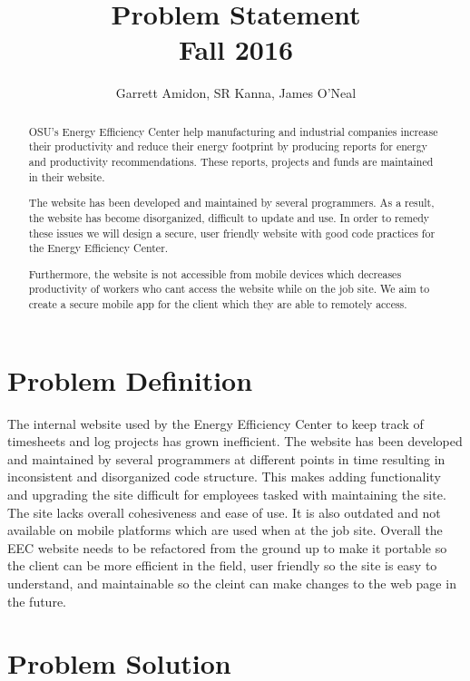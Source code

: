 \documentclass[letterpaper,10pt,titlepage,draftclsnofoot,onecolumn]{IEEEtran}
\title{Problem Statement \\
	\large Fall 2016}
\author{Garrett Amidon, SR Kanna, James O'Neal}
\begin{document}
\begin{titlingpage}
    \maketitle
	\centering{}
    \begin{abstract}
        OSU’s Energy Efficiency Center help manufacturing and industrial companies increase their productivity and reduce their energy footprint by producing reports for energy and productivity recommendations. These reports, projects and funds are maintained in their website.\newline

		The website has been developed and maintained by several programmers. As a result, the website has become disorganized, difficult to update and use. In order to remedy these issues we will design a secure, user friendly website with good code practices for the Energy Efficiency Center.\newline

		Furthermore, the website is not accessible from mobile devices which decreases productivity of workers who cant access the website while on the job site. We aim to create a secure mobile app for the client which they are able to remotely access.
    \end{abstract}
\end{titlingpage}
\section{Problem Definition}

The internal website used by the Energy Efficiency Center to keep track of timesheets and log projects has grown inefficient. The website has been developed and maintained by several programmers at different points in time resulting in inconsistent and disorganized code structure. This makes adding functionality and upgrading the site difficult for employees tasked with maintaining the site. The site lacks overall cohesiveness and ease of use. It  is also outdated and not available on mobile platforms which are used when at the job site. Overall the EEC website needs to be refactored from the ground up to make it portable so the client can be more efficient in the field, user friendly so the site is easy to understand, and maintainable so the cleint can make changes to the web page in the future. 

\section{Problem Solution}
\end{document}
